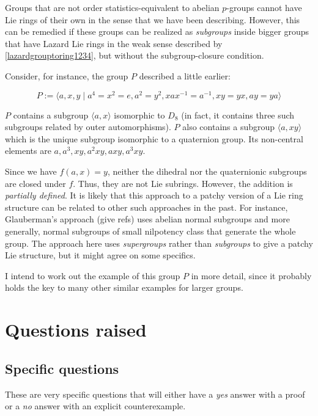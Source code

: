 \documentclass[10pt]{amsart}
\begin{document}
Groups that are not order statistics-equivalent to abelian $p$-groups
cannot have Lie rings of their own in the sense that we have been
describing. However, this can be remedied if these groups can be
realized as {\em subgroups} inside bigger groups that have Lazard Lie
rings in the weak sense described by \ref{lazardgrouptoring1234}, but
without the subgroup-closure condition.

Consider, for instance, the group $P$ described a little earlier:

$$P := \langle a,x,y \mid a^4 = x^2 = e, a^2 = y^2, xax^{-1} = a^{-1}, xy = yx, ay = ya\rangle$$

$P$ contains a subgroup $\langle a,x\rangle$ isomorphic to $D_8$ (in
fact, it contains three such subgroups related by outer
automorphisms). $P$ also contains a subgroup $\langle a, xy \rangle$
which is the unique subgroup isomorphic to a quaternion group. Its
non-central elements are $a,a^3, xy, a^2xy, axy, a^3xy$.

Since we have $f(a,x) = y$, neither the dihedral nor the quaternionic
subgroups are closed under $f$. Thus, they are not Lie
subrings. However, the addition is {\em partially defined}. It is
likely that this approach to a patchy version of a Lie ring structure
can be related to other such approaches in the past. For instance,
Glauberman's approach (give refs) uses abelian normal subgroups and
more generally, normal subgroups of small nilpotency class that
generate the whole group. The approach here uses {\em supergroups}
rather than {\em subgroups} to give a patchy Lie structure, but it
might agree on some specifics.

I intend to work out the example of this group $P$ in more detail,
since it probably holds the key to many other similar examples for
larger groups.

\section{Questions raised}

\subsection{Specific questions}

These are very specific questions that will either have a {\em yes}
answer with a proof or a {\em no} answer with an explicit
counterexample.
\end{document}
